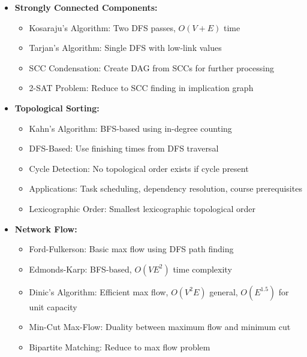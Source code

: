 \documentclass[a4paper,10pt]{book}
\begin{document}
\begin{itemize}[leftmargin=*]
    \item \textbf{Strongly Connected Components:}
    \begin{itemize}
        \item Kosaraju's Algorithm: Two DFS passes, $O(V + E)$ time
        \item Tarjan's Algorithm: Single DFS with low-link values
        \item SCC Condensation: Create DAG from SCCs for further processing
        \item 2-SAT Problem: Reduce to SCC finding in implication graph
    \end{itemize}

    \item \textbf{Topological Sorting:}
    \begin{itemize}
        \item Kahn's Algorithm: BFS-based using in-degree counting
        \item DFS-Based: Use finishing times from DFS traversal
        \item Cycle Detection: No topological order exists if cycle present
        \item Applications: Task scheduling, dependency resolution, course prerequisites
        \item Lexicographic Order: Smallest lexicographic topological order
    \end{itemize}

    \item \textbf{Network Flow:}
    \begin{itemize}
        \item Ford-Fulkerson: Basic max flow using DFS path finding
        \item Edmonds-Karp: BFS-based, $O(VE^2)$ time complexity
        \item Dinic's Algorithm: Efficient max flow, $O(V^2E)$ general, $O(E^{1.5})$ for unit capacity
        \item Min-Cut Max-Flow: Duality between maximum flow and minimum cut
        \item Bipartite Matching: Reduce to max flow problem
    \end{itemize}
\end{itemize}
\end{document}
